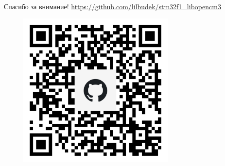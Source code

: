 \documentclass[10pt]{beamer}
\begin{document}
\begin{frame}{Спасибо за внимание!}
\url{https://github.com/lilbudek/stm32f1_libopencm3}
  \begin{figure}
  \includegraphics[width=0.7\textwidth]{qr-code}
  \end{figure}
  
\end{frame}
\end{document}
